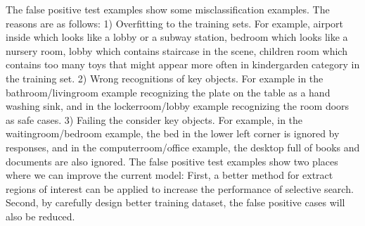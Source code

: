 The false positive test examples show some misclassification examples. The reasons are as follows: 1) Overfitting to the training sets. For example, airport inside which looks like a lobby or a subway station,  bedroom which looks like a nursery room, lobby which contains staircase in the scene, children room which contains too many toys that might appear more often in kindergarden category in the training set. 2) Wrong recognitions of key objects. For example in the bathroom/livingroom example recognizing the plate on the table as a hand washing sink, and in the lockerroom/lobby example recognizing the room doors as safe cases. 3) Failing the consider key objects. For example, in the waitingroom/bedroom example, the bed in the lower left corner is ignored by responses, and in the computerroom/office example, the desktop full of books and documents are also ignored. The false positive test examples show two places where we can improve the current model: First, a better method for extract regions of interest can be applied to increase the performance of selective search. Second, by carefully design better training dataset, the false positive cases will also be reduced.





